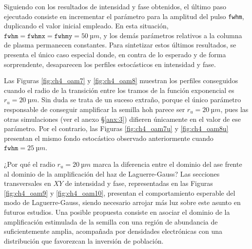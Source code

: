 Siguiendo con los resultados de intensidad y fase obtenidos, el último paso ejecutado consiste en incrementar el parámetro para la amplitud del pulso \texttt{fwhm}, duplicando el valor inicial empleado. En esta situación, $\texttt{fwhm}=\texttt{fwhmx}=\texttt{fwhmy}=\qty{50}{µm}$, y los demás parámetros relativos a la columna de plasma permanecen constantes. Para sintetizar estos últimos resultados, se presenta el único caso especial donde, en contra de lo esperado y de forma sorprendente, desaparecen los perfiles estocásticos en intensidad y fase.

Las Figuras \ref{fig:ch4_oam7} y \ref{fig:ch4_oam8} muestran los perfiles conseguidos cuando el radio de la transición entre los tramos de la función exponencial es $r_{u}=\qty{20}{µm}$. Sin duda se trata de un suceso extraño, porque el único parámetro responsable de conseguir amplificar la semilla \acrshort{hoh} parece ser $r_{u}=\qty{20}{µm}$, pues las otras simulaciones (ver el anexo \S\ref{anx:3}) difieren únicamente en el valor de ese parámetro. Por el contrario, las Figuras \ref{fig:ch4_oam7u} y \ref{fig:ch4_oam8u} presentan el mismo fondo estocástico observado anteriormente cuando $\texttt{fwhm}=\qty{25}{µm}$.

¿Por qué el radio $r_{u}=\qty{20}{µm}$ marca la diferencia entre el dominio del \acrshort{ase} frente al dominio de la amplificación del haz de Laguerre-Gauss? Las secciones transversales en $XY$ de intensidad y fase, representadas en las Figuras \ref{fig:ch4_oam9} y \ref{fig:ch4_oam10}, presentan el comportamiento esperable del modo de Laguerre-Gauss, siendo necesario arrojar más luz sobre este asunto en futuros estudios. Una posible propuesta consiste en asociar el dominio de la amplificación estimulada de la semilla con una región de abundancia de  suficientemente amplia, acompañada por densidades electrónicas con una distribución que favorezcan la inversión de población.

